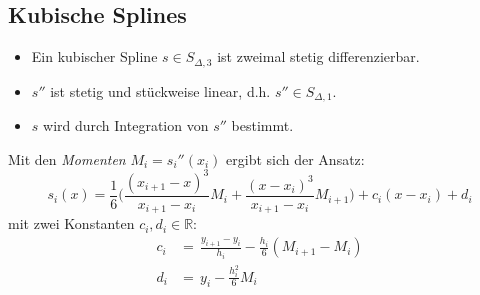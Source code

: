 \documentclass[a4paper, 11pt, accentcolor = tud3b]{tudreport}
\newcommand{\R}{\ensuremath{\mathbb{R}}}
\begin{document}
	        \subsection{Kubische Splines}
	            \begin{itemize}
	            	\item Ein kubischer Spline \( s \in S_{\Delta,3} \) ist zweimal stetig differenzierbar.
	            	\item \( s'' \) ist stetig und stückweise linear, d.h. \( s'' \in S_{\Delta,1} \).
	            	\item \(s\) wird durch Integration von \(s''\) bestimmt.
	            \end{itemize}
            
				Mit den \textit{Momenten} \( M_i = s_i''(x_i) \) ergibt sich der Ansatz:
				\begin{equation*}
					s_i(x) = \frac{1}{6} \Bigg(\frac{(x_{i+1}-x)^3}{x_{i+1}-x_i}M_i + \frac{(x-x_i)^3}{x_{i+1}-x_i}M_{i+1}\Bigg) + c_i(x-x_i) + d_i
				\end{equation*}
				mit zwei Konstanten \( c_i, d_i \in \R \):
				\begin{align*}
					c_i &=\, \frac{y_{i+1}-y_i}{h_i} - \frac{h_i}{6} (M_{i+1} - M_i) \\
					d_i &=\, y_i - \frac{h_i^2}{6} M_i
				\end{align*}
\end{document}
